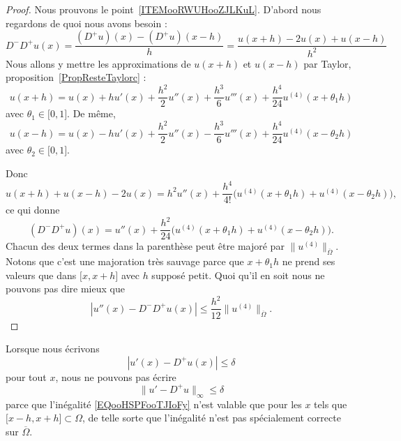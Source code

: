 \begin{proof}
	Nous prouvons le point~\ref{ITEMooRWUHooZJLKuL}. D'abord nous regardons de quoi nous avons besoin :
	\begin{equation}        \label{EQooBLIIooWHXbqD}
		D^-D^+u(x)=\frac{ (D^+u)(x)-(D^+u)(x-h) }{ h }=\frac{ u(x+h)-2u(x)+u(x-h) }{ h^2 }
	\end{equation}
	Nous allons y mettre les approximations de \( u(x+h)\) et \( u(x-h)\) par Taylor, proposition~\ref{PropResteTaylorc} :
	\begin{equation}
		u(x+h)=u(x)+hu'(x)+\frac{ h^2 }{2}u''(x)+\frac{ h^3 }{ 6 }u'''(x)+\frac{ h^4 }{ 24 }u^{(4)}(x+\theta_1h)
	\end{equation}
	avec \( \theta_1\in \mathopen[ 0 , 1 \mathclose]\). De même,
	\begin{equation}
		u(x-h)=u(x)-hu'(x)+\frac{ h^2 }{2}u''(x)-\frac{ h^3 }{ 6 }u'''(x)+\frac{ h^4 }{ 24 }u^{(4)}(x-\theta_2h)
	\end{equation}
	avec \( \theta_2\in \mathopen[ 0 , 1 \mathclose]\).

	Donc
	\begin{equation}
		u(x+h)+u(x-h)-2u(x)=h^2u''(x)+\frac{ h^4 }{ 4! }\Big( u^{(4)}(x+\theta_1h)+u^{(4)}(x-\theta_2h) \Big),
	\end{equation}
	ce qui donne
	\begin{equation}
		(D^-D^+u)(x)=u''(x)+\frac{ h^2 }{ 24 }\Big( u^{(4)}(x+\theta_1h)+u^{(4)}(x-\theta_2h) \Big).
	\end{equation}
	Chacun des deux termes dans la parenthèse peut être majoré par \( \| u^{(4)} \|_{\overline{ \Omega }}\). Notons que c'est une majoration très sauvage parce que \( x+\theta_1h\) ne prend ses valeurs que dans \( \mathopen[ x , x+h \mathclose]\) avec \( h\) supposé petit. Quoi qu'il en soit nous ne pouvons pas dire mieux que
	\begin{equation}
		| u''(x)-D^-D^+u(x) |\leq \frac{ h^2 }{ 12 }\| u^{(4)} \|_{\overline{ \Omega }}.
	\end{equation}
\end{proof}

\begin{remark}
	Lorsque nous écrivons
	\begin{equation}        \label{EQooHSPFooTJIoFy}
		| u'(x)-D^+u(x) |\leq \delta
	\end{equation}
	pour tout \( x\), nous ne pouvons pas écrire
	\begin{equation}
		\| u'-D^+u \|_{\infty}\leq \delta
	\end{equation}
	parce que l'inégalité \eqref{EQooHSPFooTJIoFy} n'est valable que pour les \( x\) tels que \( \mathopen[ x-h , x+h \mathclose]\subset \Omega\), de telle sorte que l'inégalité n'est pas spécialement correcte sur \( \overline{ \Omega }\).
\end{remark}

